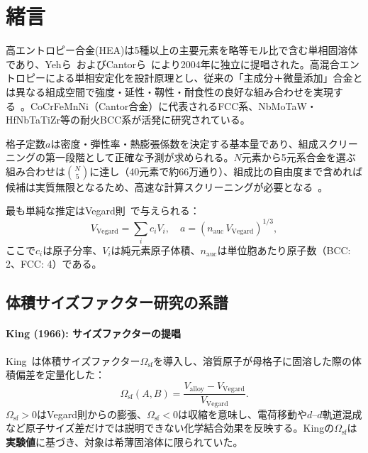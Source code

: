\documentclass[5p,10pt]{elsarticle}
\begin{document}
\section{緒言}
\label{sec:intro}

高エントロピー合金(HEA)は5種以上の主要元素を略等モル比で含む単相固溶体であり、Yehら~\cite{Yeh2004}およびCantorら~\cite{Cantor2004}により2004年に独立に提唱された。高混合エントロピーによる単相安定化を設計原理とし、従来の「主成分＋微量添加」合金とは異なる組成空間で強度・延性・靱性・耐食性の良好な組み合わせを実現する~\cite{Miracle2017}。CoCrFeMnNi（Cantor合金）に代表されるFCC系、NbMoTaW・HfNbTaTiZr等の耐火BCC系が活発に研究されている。

格子定数$a$は密度・弾性率・熱膨張係数を決定する基本量であり、組成スクリーニングの第一段階として正確な予測が求められる。$N$元素から5元系合金を選ぶ組み合わせは$\binom{N}{5}$に達し（40元素で約66万通り）、組成比の自由度まで含めれば候補は実質無限となるため、高速な計算スクリーニングが必要となる~\cite{Senkov2015}。

最も単純な推定はVegard則~\cite{Vegard1921}で与えられる：
\begin{equation}
  V_\text{Vegard} = \sum_i c_i V_i, \quad
  a = \left(n_\text{auc}\,V_\text{Vegard}\right)^{1/3},
  \label{eq:vegard}
\end{equation}
ここで$c_i$は原子分率、$V_i$は純元素原子体積、$n_\text{auc}$は単位胞あたり原子数（BCC: 2、FCC: 4）である。

\subsection{体積サイズファクター研究の系譜}

\paragraph{King (1966): サイズファクターの提唱}
King~\cite{King1966}は体積サイズファクター$\Omega_\text{sf}$を導入し、溶質原子が母格子に固溶した際の体積偏差を定量化した：
\begin{equation}
  \Omega_\text{sf}(A,B) = \frac{V_\text{alloy} - V_\text{Vegard}}
    {V_\text{Vegard}}.
  \label{eq:omega_sf_def}
\end{equation}
$\Omega_\text{sf} > 0$はVegard則からの膨張、$\Omega_\text{sf} < 0$は収縮を意味し、電荷移動や$d$--$d$軌道混成など原子サイズ差だけでは説明できない化学結合効果を反映する。Kingの$\Omega_\text{sf}$は\textbf{実験値}に基づき、対象は希薄固溶体に限られていた。
\end{document}
